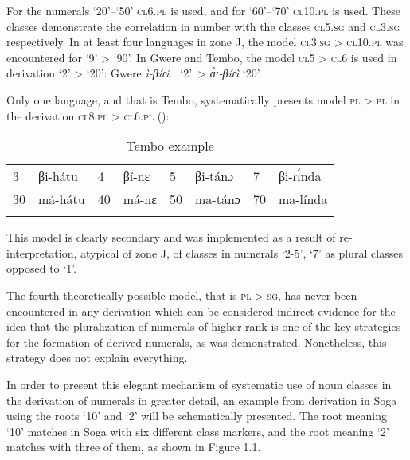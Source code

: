 For the numerals ‘20’–‘50’ \textsc{cl}6.\textsc{pl} is used, and for ‘60’–‘70’ \textsc{cl}10.\textsc{pl} is used. These classes demonstrate the correlation in number with the classes \textsc{cl}5.\textsc{sg} and \textsc{cl}3.\textsc{sg} respectively. In at least four languages in zone J, the model \textsc{cl}3.\textsc{sg} > \textsc{cl}10.\textsc{pl} was encountered for ‘9’ > ‘90’. In Gwere and Tembo, the model \textsc{cl}5 > \textsc{cl}6 is used in derivation ‘2’ > ‘20’: Gwere \textit{ì-β}\textit{íɾí}~~‘2’~>  \textit{{\`{ɑ}}ː-β}\textit{íɾì} ‘20’. 

Only one language, and that is Tembo, systematically presents model \textsc{pl} > \textsc{pl} in the derivation \textsc{cl}8.\textsc{pl}  > \textsc{cl}6.\textsc{pl} ():


\begin{table}
\caption{\label{tab:1:24} Tembo example}

\begin{tabularx}{\textwidth}{lX lX lX lX}
\lsptoprule

3 &  βi-hátu & 4 &  βí-nɛ & 5 &  βi-tánɔ & 7 &  βi-ɾ{\'{ɪ}}nda\\
30 & má-hátu & 40 & má-nɛ & 50 & ma-tánɔ & 70 & ma-línda\\
\lspbottomrule
\end{tabularx}
\end{table}


This model is clearly secondary and was implemented as a result of re-interpretation, atypical of zone J, of classes in numerals ‘2-5’, ‘7’ as plural classes opposed to ‘1’. 

The fourth theoretically possible model, that is \textsc{pl} > \textsc{sg}, has never been encountered in any derivation which can be considered indirect evidence for the idea that the pluralization of numerals of higher rank is one of the key strategies for the formation of derived numerals, as was demonstrated. Nonetheless, this strategy does not explain everything. 

In order to present this elegant mechanism of systematic use of noun classes in the derivation of numerals in greater detail, an example from derivation in Soga using the roots `10' and `2' will be schematically presented. The root meaning `10' matches in Soga with six different class markers, and the root meaning ‘2’ matches with three of them, as shown in Figure 1.1. 
 







